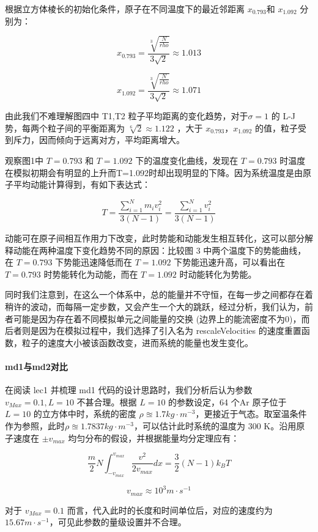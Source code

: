 \documentclass[
]{article}
\begin{document}
根据立方体棱长的初始化条件，原子在不同温度下的最近邻距离 \(x_{0.793}\)和
\(x_{1.092}\) 分别为：

\[x_{0.793} = \frac{\sqrt[3] {\frac{N}{rho}} }{3\sqrt{2}} \approx 1.013\]

\[x_{1.092} = \frac{\sqrt[3] {\frac{N}{rho}} }{3\sqrt{2}} \approx 1.071\]

由此我们不难理解图四中 T1,T2 粒子平均距离的变化趋势，对于\(\sigma = 1\)
的 L-J 势，每两个粒子间的平衡距离为 \(\sqrt[6]{2} \approx 1.122\) ，大于
\(x_{0.793}， x_{1.092}\)
的值，粒子受到斥力，因而倾向于远离对方，平均距离增大。

观察图1中 \(T=0.793\) 和 \(T=1.092\) 下的温度变化曲线，发现在
\(T=0.793\)
时温度在模拟初期会有明显的上升而T=1.092时却出现明显的下降。因为系统温度是由原子平均动能计算得到，有如下表达式：

\[T=\frac{\sum_{i=1}^{N}m_iv_i^2}{3(N-1)}=\frac{\sum_{i=1}^{N}v_i^2}{3(N-1)}\]

动能可在原子间相互作用力下改变，此时势能和动能发生相互转化，这可以部分解释动能在两种温度下变化趋势不同的原因：比较图
3 中两个温度下的势能曲线，在 \(T=0.793\) 下势能迅速降低而在 \(T=1.092\)
下势能迅速升高，可以看出在 \(T=0.793\) 时势能转化为动能，而在
\(T=1.092\) 时动能转化为势能。

同时我们注意到，在这么一个体系中，总的能量并不守恒，在每一步之间都存在着稍许的波动，而每隔一定步数，又会产生一个大的跳跃，经过分析，我们认为，前者可能是因为存在着不同模拟单元之间能量的交换
(边界上的能流密度不为0)，而后者则是因为在模拟过程中，我们选择了引入名为
rescaleVelocities
的速度重置函数，粒子的速度大小被该函数改变，进而系统的能量也发生变化。

\hypertarget{header-n45}{%
\paragraph{md1与md2对比}\label{header-n45}}

在阅读 lec1 并梳理 md1 代码的设计思路时，我们分析后认为参数
\(v_{Max}=0.1,L=10\) 不甚合理。根据 \(L=10\) 的参数设定，64 个Ar
原子位于 \(L=10\) 的立方体中时，系统的密度
\(\rho \approxeq 1.7 kg·m^{-3}\)，更接近于气态。取室温条件作为参照，此时\(\rho \approxeq 1.7837kg·m^{-3}\)，可以估计此时系统的温度为
300 K。沿用原子速度在 \(\pm v_{max}\)
均匀分布的假设，并根据能量均分定理应有：

\[\frac{m}{2}N\int_{-v_{max}}^{v_{max}} \frac{v^2}{2v_{max}}dx = \frac{3}{2}(N-1)k_B T\]

\[v_{max}\approx10^3m·s^{-1}\]

对于 \(v_{Max}=0.1\) 而言，代入此时的长度和时间单位后，对应的速度约为
\(15.67m·s^{-1}\)，可见此参数的量级设置并不合理。
\end{document}
